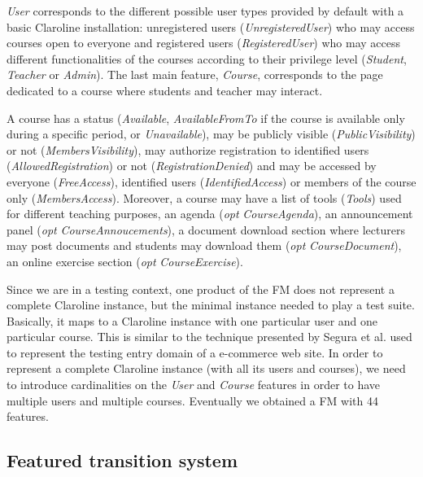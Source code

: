 \textit{User} corresponds to the different possible user types provided by default with a basic Claroline installation: unregistered users (\textit{UnregisteredUser}) who may access courses open to everyone and registered users (\textit{RegisteredUser}) who may access different functionalities of the courses according to their privilege level (\textit{Student}, \textit{Teacher} or \textit{Admin}). The last main feature, \textit{Course}, corresponds to the page dedicated to a course where students and teacher may interact.

A course has a status (\textit{Available}, \textit{AvailableFromTo} if the course is available only during a specific period, or \textit{Unavailable}), may be publicly visible (\textit{PublicVisibility}) or not (\textit{MembersVisibility}), may authorize registration to identified users (\textit{AllowedRegistration}) or not (\textit{RegistrationDenied}) and may be accessed by everyone (\textit{FreeAccess}), identified users (\textit{IdentifiedAccess}) or members of the course only (\textit{MembersAccess}). Moreover, a course may have a list of tools (\textit{Tools}) used for different teaching purposes, \eg an agenda (\textit{opt} \textit{CourseAgenda}), an announcement panel (\textit{opt} \textit{CourseAnnoucements}), a document download section where lecturers may post documents and students may download them (\textit{opt} \textit{CourseDocument}), an online exercise section (\textit{opt} \textit{CourseExercise}).
 
Since we are in a testing context, one product of the FM does not represent a complete Claroline instance, but the minimal instance needed to play a test suite. Basically, it maps to a Claroline instance with one particular user and one particular course.
This is similar to the technique presented by Segura et al. \cite{Segura2014} used to represent the testing entry domain of a e-commerce web site.
In order to represent a complete Claroline instance (with all its users and courses), we need to introduce cardinalities \cite{Michel2011} on the \textit{User} and  \textit{Course} features in order to have multiple users and multiple courses. Eventually we obtained a FM with 44 features.

\subsection{Featured transition system} 

\label{sec:casestudy:claroline:fts}

